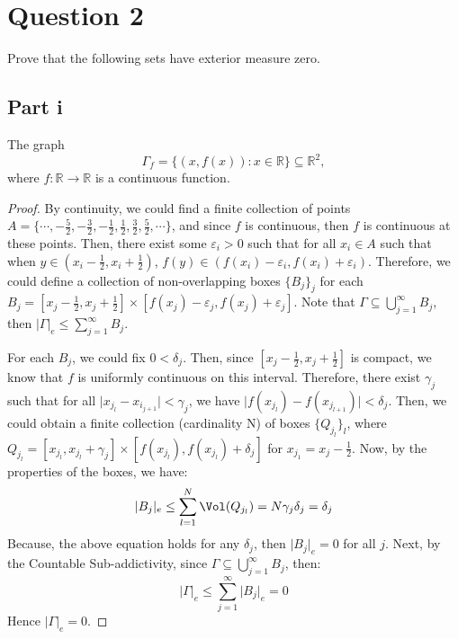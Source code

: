 \section{Question 2}

\begin{question}
    Prove that the following sets have exterior measure zero.
\end{question}

\subsection{Part i}

\begin{question}
    The graph
    $$
        \Gamma_f=\{(x, f(x)): x \in \mathbb{R}\} \subseteq \mathbb{R}^2,
    $$
    where $f: \mathbb{R} \rightarrow \mathbb{R}$ is a continuous function.
\end{question}

\begin{answer}
    \begin{proof}
        By continuity, we could find a finite collection of points $A = \{\cdots, -\tfrac{5}{2}, -\tfrac{3}{2}, -\tfrac{1}{2}, \tfrac{1}{2}, \tfrac{3}{2}, \tfrac{5}{2}, \cdots\}$, and since $f$ is continuous, then $f$ is continuous at these points. Then, there exist some $\varepsilon_i > 0$ such that for all $x_i \in A$ such that when $y \in (x_i - \tfrac{1}{2}, x_i + \tfrac{1}{2})$, $f(y) \in (f(x_i) - \varepsilon_i, f(x_i) + \varepsilon_i)$. Therefore, we could define a collection of non-overlapping boxes $\{B_j\}_j$ for each $B_j = [x_j - \tfrac{1}{2}, x_j + \tfrac{1}{2}] \times [f(x_j) - \varepsilon_j, f(x_j) + \varepsilon_j]$. Note that $\Gamma \subseteq \bigcup_{j = 1}^{\infty}B_j$, then $\lvert \Gamma \rvert_e \leq \sum_{j=1}^{\infty}B_j$.
        
        For each $B_j$, we could fix $0 < \delta_j$. Then, since $[x_j - \tfrac{1}{2}, x_j + \tfrac{1}{2}]$ is compact, we know that $f$ is uniformly continuous on this interval. Therefore, there exist $\gamma_j$ such that for all $\lvert x_{j_l} - x_{i_{j+1}} \lvert < \gamma_j$, we have $\lvert f(x_{j_l}) - f(x_{j_{l+1}}) \rvert < \delta_j$. Then, we could obtain a finite collection (cardinality N) of boxes $\{Q_{j_l}\}_l$, where $Q_{j_l} = [x_{j_l}, x_{j_l} + \gamma_j] \times [f(x_{j_l}), f(x_{j_l})+\delta_j]$ for $x_{j_1} = x_j - \tfrac{1}{2}$. Now, by the properties of the boxes, we have:
        \begin{equation}
            \lvert B_j \rvert_e \leq \sum_{l = 1}^{N}\Vol(Q_{j_l}) = N\gamma_j\delta_j = \delta_j
        \end{equation}
        Because, the above equation holds for any $\delta_j$, then $\lvert B_j \rvert_e = 0$ for all $j$. Next, by the Countable Sub-addictivity, since $\Gamma \subseteq \bigcup_{j = 1}^{\infty}B_j$, then:
        \begin{equation}
            \lvert \Gamma \rvert_e \leq \sum_{j=1}^{\infty} \lvert B_j \rvert_e = 0
        \end{equation}
        Hence $\lvert \Gamma \rvert_e = 0$.
    \end{proof}
\end{answer}

